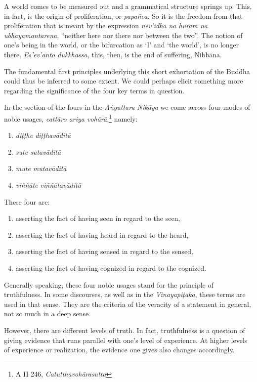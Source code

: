 A world comes to be measured out and a grammatical structure springs up. This, in fact, is the origin of proliferation, or \emph{papañca}. So it is the freedom from that proliferation that is meant by the expression \emph{nev'idha na huraṁ na ubhayamantarena}, ``neither here nor there nor between the two''. The notion of one's being in the world, or the bifurcation as `I' and `the world', is no longer there. \emph{Es'ev'anto dukkhassa}, this, then, is the end of suffering, Nibbāna.

The fundamental first principles underlying this short exhortation of the Buddha could thus be inferred to some extent. We could perhaps elicit something more regarding the significance of the four key terms in question.

In the section of the fours in the \emph{Aṅguttara Nikāya} we come across four modes of noble usages, \emph{cattāro ariya vohārā},\footnote{A II 246, \emph{Catutthavohārasutta}} namely:

\begin{enumerate}
\def\labelenumi{\arabic{enumi}.}
\tightlist
\item
  \emph{diṭṭhe diṭṭhavāditā}
\item
  \emph{sute sutavāditā}
\item
  \emph{mute mutavāditā}
\item
  \emph{viññāte viññātavāditā}
\end{enumerate}

These four are:

\begin{enumerate}
\def\labelenumi{\arabic{enumi}.}
\tightlist
\item
  asserting the fact of having seen in regard to the seen,
\item
  asserting the fact of having heard in regard to the heard,
\item
  asserting the fact of having sensed in regard to the sensed,
\item
  asserting the fact of having cognized in regard to the cognized.
\end{enumerate}

Generally speaking, these four noble usages stand for the principle of truthfulness. In some discourses, as well as in the \emph{Vinayapiṭaka}, these terms are used in that sense. They are the criteria of the veracity of a statement in general, not so much in a deep sense.

However, there are different levels of truth. In fact, truthfulness is a question of giving evidence that runs parallel with one's level of experience. At higher levels of experience or realization, the evidence one gives also changes accordingly.

